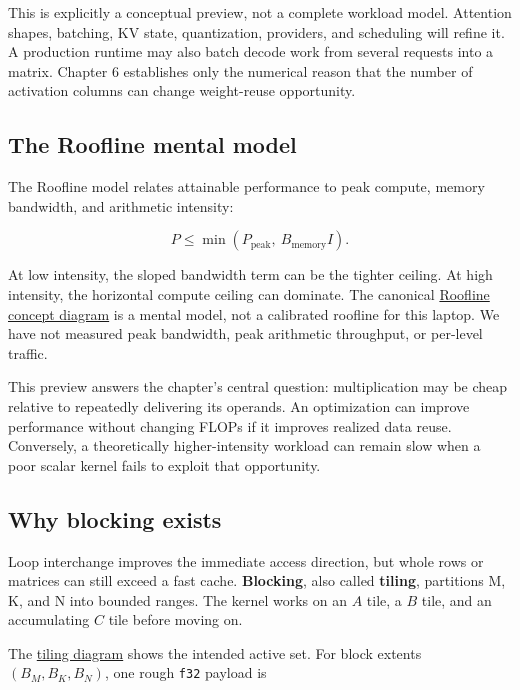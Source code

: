 \documentclass[
  10pt,
]{article}
\begin{document}
This is explicitly a conceptual preview, not a complete workload model.
Attention shapes, batching, KV state, quantization, providers, and
scheduling will refine it. A production runtime may also batch decode
work from several requests into a matrix. Chapter 6 establishes only the
numerical reason that the number of activation columns can change
weight-reuse opportunity.

\subsection{The Roofline mental model}\label{the-roofline-mental-model}

The Roofline model relates attainable performance to peak compute,
memory bandwidth, and arithmetic intensity:

\[
P\le\min\left(P_{\mathrm{peak}},\ B_{\mathrm{memory}}I\right).
\]

At low intensity, the sloped bandwidth term can be the tighter ceiling.
At high intensity, the horizontal compute ceiling can dominate. The
canonical
\href{https://github.com/hermonai/inside-the-llm-engine/blob/astra-visual-rewrite/diagrams/linear/roofline-concept.txt}{Roofline
concept diagram} is a mental model, not a calibrated roofline for this
laptop. We have not measured peak bandwidth, peak arithmetic throughput,
or per-level traffic.

This preview answers the chapter's central question: multiplication may
be cheap relative to repeatedly delivering its operands. An optimization
can improve performance without changing FLOPs if it improves realized
data reuse. Conversely, a theoretically higher-intensity workload can
remain slow when a poor scalar kernel fails to exploit that opportunity.

\subsection{Why blocking exists}\label{why-blocking-exists}

Loop interchange improves the immediate access direction, but whole rows
or matrices can still exceed a fast cache. \textbf{Blocking}, also
called \textbf{tiling}, partitions M, K, and N into bounded ranges. The
kernel works on an \(A\) tile, a \(B\) tile, and an accumulating \(C\)
tile before moving on.

The
\href{https://github.com/hermonai/inside-the-llm-engine/blob/astra-visual-rewrite/diagrams/linear/cache-reuse-and-tiling.txt}{tiling
diagram} shows the intended active set. For block extents
\((B_M,B_K,B_N)\), one rough \texttt{f32} payload is
\end{document}
